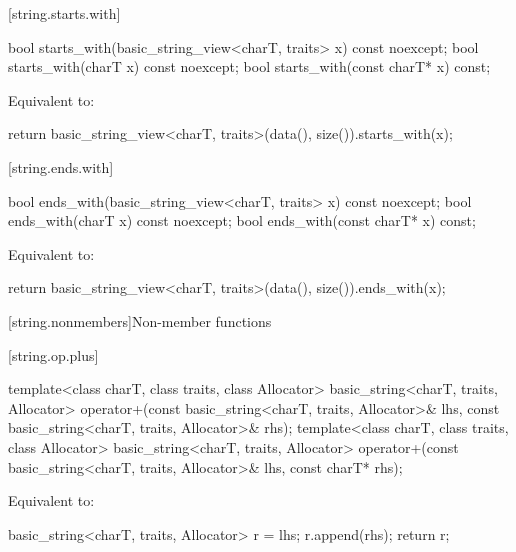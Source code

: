 [string.starts.with]{}

%
\begin{itemdecl}
bool starts_with(basic_string_view<charT, traits> x) const noexcept;
bool starts_with(charT x) const noexcept;
bool starts_with(const charT* x) const;
\end{itemdecl}

\begin{itemdescr}
\pnum
\effects
Equivalent to:
\begin{codeblock}
return basic_string_view<charT, traits>(data(), size()).starts_with(x);
\end{codeblock}
\end{itemdescr}

[string.ends.with]{}

%
\begin{itemdecl}
bool ends_with(basic_string_view<charT, traits> x) const noexcept;
bool ends_with(charT x) const noexcept;
bool ends_with(const charT* x) const;
\end{itemdecl}

\begin{itemdescr}
\pnum
\effects
Equivalent to:
\begin{codeblock}
return basic_string_view<charT, traits>(data(), size()).ends_with(x);
\end{codeblock}
\end{itemdescr}

[string.nonmembers]{Non-member functions}


[string.op.plus]{}

%
\begin{itemdecl}
template<class charT, class traits, class Allocator>
  basic_string<charT, traits, Allocator>
    operator+(const basic_string<charT, traits, Allocator>& lhs,
              const basic_string<charT, traits, Allocator>& rhs);
template<class charT, class traits, class Allocator>
  basic_string<charT, traits, Allocator>
    operator+(const basic_string<charT, traits, Allocator>& lhs, const charT* rhs);
\end{itemdecl}

\begin{itemdescr}
\pnum
\effects
Equivalent to:
\begin{codeblock}
basic_string<charT, traits, Allocator> r = lhs;
r.append(rhs);
return r;
\end{codeblock}
\end{itemdescr}

